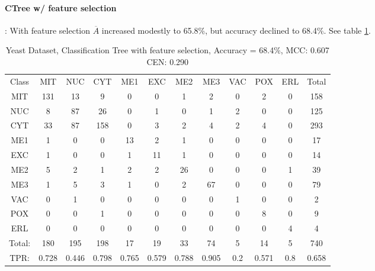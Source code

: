 \paragraph{CTree w/ feature selection}:
With feature selection $\overline{A}$ increased modestly to 65.8\%, but accuracy declined to 68.4\%.  See table \ref{tab:yeastctreefeatures}.\\  
\begin{table}[h]

\begin{tabular}{|c|c|c|c|c|c|c|c|c|c|c|c|}
	\hline
Class&MIT&NUC&CYT&ME1&EXC&ME2&ME3&VAC&POX&ERL&Total\\
MIT&131&13&9&0&0&1&2&0&2&0&158\\
NUC&8&87&26&0&1&0&1&2&0&0&125\\
CYT&33&87&158&0&3&2&4&2&4&0&293\\
ME1&1&0&0&13&2&1&0&0&0&0&17\\
EXC&1&0&0&1&11&1&0&0&0&0&14\\
ME2&5&2&1&2&2&26&0&0&0&1&39\\
ME3&1&5&3&1&0&2&67&0&0&0&79\\
VAC&0&1&0&0&0&0&0&1&0&0&2\\
POX&0&0&1&0&0&0&0&0&8&0&9\\
ERL&0&0&0&0&0&0&0&0&0&4&4\\
\hline
Total:&180&195&198&17&19&33&74&5&14&5&740\\
TPR:&0.728&0.446&0.798&0.765&0.579&0.788&0.905&0.2&0.571&0.8&0.658\\
\hline


\end{tabular}
\caption[Yeast: Classification Tree with Feature Selection Confusion Matrix]{Yeast Dataset, Classification Tree with feature selection, Accuracy = 68.4\%, MCC: 0.607 CEN: 0.290}
\label{tab:yeastctreefeatures}
\end{table}

